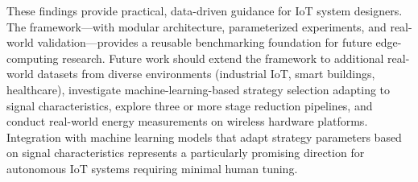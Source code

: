 \documentclass[10pt,twocolumn]{article}
\begin{document}
These findings provide practical, data-driven guidance for IoT system designers. The framework---with modular architecture, parameterized experiments, and real-world validation---provides a reusable benchmarking foundation for future edge-computing research. Future work should extend the framework to additional real-world datasets from diverse environments (industrial IoT, smart buildings, healthcare), investigate machine-learning-based strategy selection adapting to signal characteristics, explore three or more stage reduction pipelines, and conduct real-world energy measurements on wireless hardware platforms. Integration with machine learning models that adapt strategy parameters based on signal characteristics represents a particularly promising direction for autonomous IoT systems requiring minimal human tuning.
\end{document}
